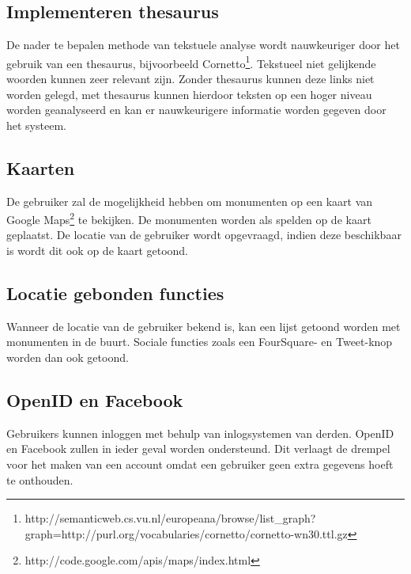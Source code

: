 \documentclass[a4paper,10pt]{article}
\begin{document}
			\subsection{Implementeren thesaurus}
			De nader te bepalen methode van tekstuele analyse wordt nauwkeuriger door het gebruik van een thesaurus, bijvoorbeeld Cornetto\footnote{http://semanticweb.cs.vu.nl/europeana/browse/list\_graph?graph=http://purl.org/vocabularies/cornetto/cornetto-wn30.ttl.gz}. Tekstueel niet gelijkende woorden kunnen zeer relevant zijn. Zonder thesaurus kunnen deze links niet worden gelegd, met thesaurus kunnen hierdoor teksten op een hoger niveau worden geanalyseerd en kan er nauwkeurigere informatie worden gegeven door het systeem.
		
			\subsection{Kaarten}
			De gebruiker zal de mogelijkheid hebben om monumenten op een kaart van Google Maps\footnote{http://code.google.com/apis/maps/index.html} te bekijken. De monumenten worden als spelden op de kaart geplaatst. De locatie van de gebruiker wordt opgevraagd, indien deze beschikbaar is wordt dit ook op de kaart getoond.
			
			\subsection{Locatie gebonden functies}
			Wanneer de locatie van de gebruiker bekend is, kan een lijst getoond worden met monumenten in de buurt. Sociale functies zoals een FourSquare- en Tweet-knop worden dan ook getoond.
			
			\subsection{OpenID en Facebook}
			Gebruikers kunnen inloggen met behulp van inlogsystemen van derden. OpenID en Facebook zullen in ieder geval worden ondersteund. Dit verlaagt de drempel voor het maken van een account omdat een gebruiker geen extra gegevens hoeft te onthouden.
		
		\clearpage
\end{document}
